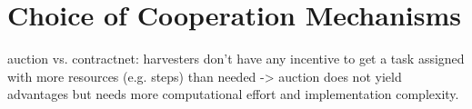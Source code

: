 \section{Choice of Cooperation Mechanisms}

auction vs. contractnet:
harvesters don't have any incentive to get a task assigned with more resources (e.g. steps) than needed -> auction does not yield advantages but needs more computational effort and implementation complexity.